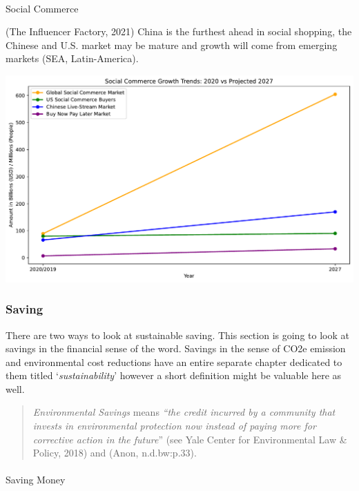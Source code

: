 \documentclass[
  letterpaper,
  DIV=11,
  numbers=noendperiod]{scrartcl}
\makeatletter
\let\oldparagraph\paragraph
\renewcommand{\paragraph}{
    \@ifstar
      \xxxParagraphStar
      \xxxParagraphNoStar
  }
\newcommand{\xxxParagraphStar}[1]{\oldparagraph*{#1}\mbox{}}
\newcommand{\xxxParagraphNoStar}[1]{\oldparagraph{#1}\mbox{}}
\makeatother
\begin{document}
\paragraph{Social Commerce}\label{social-commerce}

(The Influencer Factory, 2021) China is the furthest ahead in social
shopping, the Chinese and U.S. market may be mature and growth will come
from emerging markets (SEA, Latin-America).

\includegraphics{_thesis_files/figure-pdf/cell-37-output-1.pdf}

\subsubsection{Saving}\label{saving}

There are two ways to look at sustainable saving. This section is going
to look at savings in the financial sense of the word. Savings in the
sense of CO2e emission and environmental cost reductions have an entire
separate chapter dedicated to them titled `\emph{sustainability}'
however a short definition might be valuable here as well.

\begin{quote}
\emph{Environmental Savings} means \emph{``the credit incurred by a
community that invests in environmental protection now instead of paying
more for corrective action in the future}'' (see Yale Center for
Environmental Law \& Policy, 2018) and (Anon, n.d.bw:p.33).
\end{quote}

\paragraph{Saving Money}\label{saving-money}
\end{document}
